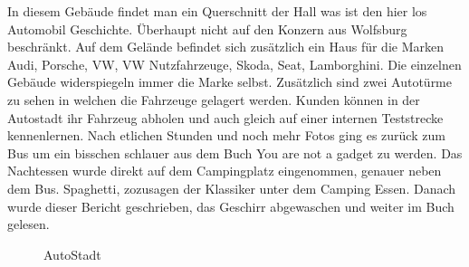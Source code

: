 In diesem Gebäude findet man ein Querschnitt der Hall was ist den hier los Automobil Geschichte.
Überhaupt nicht auf den Konzern aus Wolfsburg beschränkt.
Auf dem Gelände befindet sich zusätzlich ein Haus für die Marken Audi, Porsche, VW, VW Nutzfahrzeuge, Skoda, Seat, Lamborghini.
Die einzelnen Gebäude widerspiegeln immer die Marke selbst. 
Zusätzlich sind zwei Autotürme zu sehen in welchen die Fahrzeuge gelagert werden.
Kunden können in der Autostadt ihr Fahrzeug abholen und auch gleich auf einer internen Teststrecke kennenlernen.
Nach etlichen Stunden und noch mehr Fotos ging es zurück zum Bus um ein bisschen schlauer aus dem Buch \glqq You are not a gadget\grqq{} zu werden.
Das Nachtessen wurde direkt auf dem Campingplatz eingenommen, genauer neben dem Bus.
Spaghetti, zozusagen der Klassiker unter dem Camping Essen.
Danach wurde dieser Bericht geschrieben, das Geschirr abgewaschen und weiter im Buch gelesen.

\begin{figure}[H]
   \centering
   \quad
   \quad
   \quad
   \caption[AutoStadt]{AutoStadt}
\end{figure}

